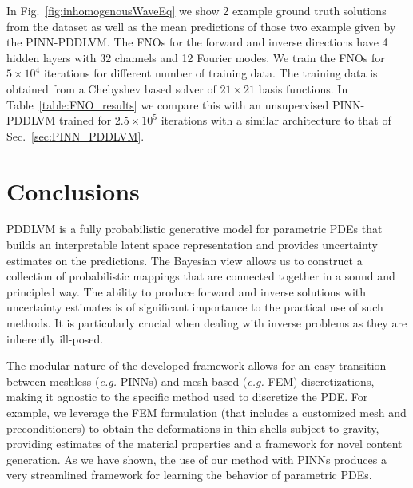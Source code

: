 \documentclass[11pt, fleqn]{article}
\begin{document}
In Fig.~\ref{fig:inhomogenousWaveEq} we show 2 example ground truth solutions from the dataset as well as the mean predictions of those two example given by the \gls*{PINN}-\gls*{PDDLVM}. The FNOs for the forward and inverse directions have 4 hidden layers with 32 channels and 12 Fourier modes. We train the FNOs for $5\times10^4$ iterations for different number of training data. The training data is obtained from a Chebyshev based solver of $21\times21$ basis functions. In Table~\ref{table:FNO_results} we compare this with an unsupervised PINN-PDDLVM trained for $2.5\times10^5$ iterations with a similar architecture to that of Sec.~\ref{sec:PINN_PDDLVM}.


\section{Conclusions}
%
\gls*{PDDLVM} is a fully probabilistic generative model for parametric PDEs that builds an interpretable latent space representation and provides uncertainty estimates on the predictions. The Bayesian view allows us to construct a collection of probabilistic mappings that are connected together in a sound and principled way. The ability to produce forward and inverse solutions with uncertainty estimates is of significant importance to the practical use of such methods. It is particularly crucial when dealing with inverse problems  as they are inherently ill-posed.

The modular nature of the developed framework allows for an easy transition between meshless (\emph{e.g.} \gls*{PINN}s) and mesh-based (\emph{e.g.} \gls*{FEM}) discretizations, making it agnostic to the specific method used to discretize the PDE. For example, we leverage the \gls*{FEM} formulation (that includes a customized mesh and preconditioners) to obtain the deformations in thin shells subject to gravity, providing estimates of the material properties and a framework for novel content generation. As we have shown, the use of our method with \gls*{PINN}s produces a very streamlined framework for learning the behavior of parametric PDEs.
\end{document}
